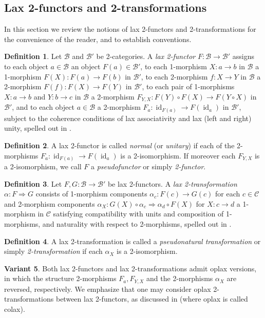 \documentclass{article}
\newcommand{\id}{\operatorname{id}}%
\newcommand{\B}{\mathcal{B}}
\newcommand{\C}{\mathcal{C}}
\numberwithin{equation}{section}
\theoremstyle{definition}
\newtheorem{definition}{Definition}[subsection]
\newtheorem{variant}[definition]{Variant}
\theoremstyle{theorem}
\begin{document}
\subsection{Lax 2-functors and 2-transformations}\label{Subsection: lax 2-functors and transformations}
In this section we review the notions of lax 2-functors and 2-transformations for the convenience of the reader, and to establish conventions.
\begin{definition}
    Let $\B$ and $\B'$ be 2-categories. A \emph{lax 2-functor} $F \colon \B \to \B'$ assigns to each object $a \in \B$ an object $F(a) \in \B'$, to each 
    1-morphism $X \colon a \to b$ in $\B$ a 1-morphism $F(X) \colon F(a) \to F(b)$ in $\B'$, to each 2-morphism $f \colon X \to Y$ in $\B$ a 2-morphism 
    $F(f) \colon F(X) \to F(Y)$ in $\B'$, to each pair of 1-morphisms $X \colon a \to b$ and $Y \colon b \to c$ in $\B$ a 2-morphism 
    $F_{Y,X} \colon F(Y) \circ F(X) \to F(Y \circ X)$ in $\B'$, and to each object $a \in \B$ a 2-morphism $F_a \colon \id_{F(a)} \to F(\id_a)$ in $\B'$, 
    subject to the coherence conditions of lax associativity and lax (left and right) unity, spelled out in \cite[Definition 4.1.2]{johnson20202dimensionalcategories}.
\end{definition}
\begin{definition}
    A lax 2-functor is called \emph{normal} (or \emph{unitary}) if each of the 2-morphisms $F_a \colon \id_{F(a)} \to F(\id_a)$ is a 2-isomorphism. 
    If moreover each $F_{Y,X}$ is a 2-isomorphism, we call $F$ a \emph{pseudofunctor} or simply \emph{2-functor}. 
\end{definition}
\begin{definition}
    Let $F,G \colon \B \to \B'$ be lax 2-functors. A \emph{lax 2-transformation} $\alpha \colon F \Rightarrow G$ consists of 1-morphism components 
    $\alpha_c \colon F(c) \to G(c)$ for each $c \in \C$ and 2-morphism components $\alpha_X \colon G(X) \circ \alpha_c \Rightarrow \alpha_d \circ F(X)$ for 
    $X \colon c \to d$ a 1-morphism in $\C$ satisfying compatibility with units and composition of 1-morphisms, and naturality with respect to 2-morphisms, 
    spelled out in \cite[Definition 4.2.1]{johnson20202dimensionalcategories}.
\end{definition}
\begin{definition}
    A lax 2-transformation is called a \emph{pseudonatural transformation} or simply \emph{2-transformation} if each $\alpha_X$ is a 2-isomorphism.
\end{definition}
\begin{variant}
    Both lax 2-functors and lax 2-transformations admit oplax versions, in which the structure 2-morphisms $F_a,F_{Y,X}$ and the 2-morphisms $\alpha_X$ 
    are reversed, respectively. We emphasize that one may consider oplax 2-transformations between lax 2-functors, as discussed in 
    \cite[Section 4.3]{johnson20202dimensionalcategories} (where oplax is called colax).
\end{variant}
\end{document}
